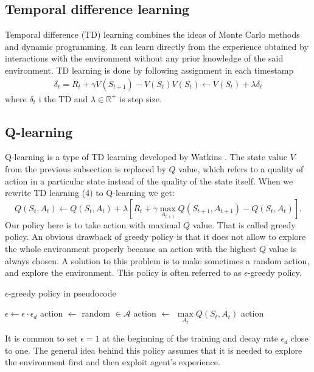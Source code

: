 \subsection{Temporal difference learning}
Temporal difference (TD) learning combines the ideas of Monte Carlo methods and dynamic programming. It can learn directly from the experience obtained by interactions with the environment without any prior knowledge of the said environment. TD learning is done by following assignment in each timestamp \cite{sutton2012}
\begin{align}
\delta_t = R_{t} + \gamma V(S_{t+1}) - V(S_t)
V(S_t) \gets V(S_t) + \lambda \delta_t
\end{align}
where $\delta_t$ i the TD and $\lambda \in \mathbb{R}^+$ is step size.

\subsection{Q-learning}
Q-learning is a type of TD learning developed by Watkins \cite{watkins1992}. The state value $V$ from the previous subsection is replaced by $Q$ value, which refers to a quality of action in a particular state instead of the quality of the state itself. When we rewrite TD learning (4) to Q-learning we get:
\begin{equation}
Q(S_t, A_t) \gets Q(S_t, A_t) + \lambda [R_{t} + \gamma \underset{A_{t+1}}{\max} Q(S_{t+1}, A_{t+1}) - Q(S_t, A_t)].
\end{equation}
Our policy here is to take action with maximal $Q$ value. That is called greedy policy. An obvious drawback of greedy policy is that it does not allow to explore the whole environment properly because an action with the highest $Q$ value is always chosen. A solution to this problem is to make sometimes a random action, and explore the environment. This policy is often referred to as $\epsilon$-greedy policy.

\begin{algorithm}
\caption{$\epsilon$-greedy policy in pseudocode}
\begin{algorithmic}[1]
\State $\epsilon \gets \epsilon \cdot \epsilon_d$
\State action $\gets$ random $\in \mathcal{A}$
\Else 
\State action $\gets$ $\underset{A_t}{\max} Q(S_t, A_t)$
\EndIf
\State \Return action
\EndFunction
\end{algorithmic}
\end{algorithm}

It is common to set $\epsilon = 1$ at the beginning of the training and decay rate $\epsilon_d$ close to one. The general idea behind this policy assumes that it is needed to explore the environment first and then exploit agent's experience.

